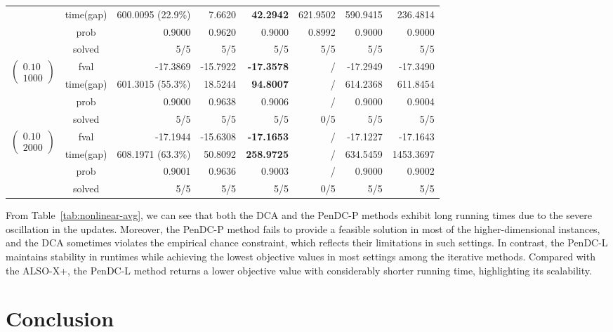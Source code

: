 \documentclass[11pt]{article}
\begin{document}
\begin{table}[ht!]
\begin{tabular}{ccrrrrrr}
& time(gap)  & 600.0095 (22.9\%) & 7.6620 & \textbf{42.2942} & 621.9502 & 590.9415 & 236.4814\\
& prob  & 0.9000 & 0.9620 & 0.9000 & 0.8992 & 0.9000 & 0.9000\\
& solved & 5/5 & 5/5 & 5/5 & 5/5 & 5/5 & 5/5\\
\midrule
\multirow{4}{*}{$\left(\begin{array}{c} 0.10 \\ 1000 \end{array}\right)$} & fval  & -17.3869 & -15.7922 & \textbf{-17.3578} & / & -17.2949 & -17.3490\\
& time(gap)  & 601.3015 (55.3\%) & 18.5244 & \textbf{94.8007} & / & 614.2368 & 611.8454\\
& prob  & 0.9000 & 0.9638 & 0.9006 & / & 0.9000 & 0.9004\\
& solved & 5/5 & 5/5 & 5/5 & 0/5 & 5/5 & 5/5\\
\midrule
\multirow{4}{*}{$\left(\begin{array}{c} 0.10 \\ 2000 \end{array}\right)$} & fval  & -17.1944 & -15.6308 & \textbf{-17.1653} & / & -17.1227 & -17.1643\\
& time(gap)  & 608.1971 (63.3\%) & 50.8092 & \textbf{258.9725} & / & 634.5459 & 1453.3697\\
& prob  & 0.9001 & 0.9636 & 0.9003 & / & 0.9000 & 0.9002\\
& solved & 5/5 & 5/5 & 5/5 & 0/5 & 5/5 & 5/5\\
\bottomrule
\end{tabular}
\vspace{2pt}
\end{table}

From Table~\ref{tab:nonlinear-avg}, we can see that both the DCA and the PenDC-P methods exhibit long running times due to the severe oscillation in the updates. Moreover, the PenDC-P method fails to provide a feasible solution in most of the higher-dimensional instances, and the DCA sometimes violates the empirical chance constraint, which reflects their limitations in such settings. 
In contrast, the PenDC-L maintains stability in runtimes while achieving the lowest objective values in most settings among the iterative methods. Compared with the ALSO-X+, the PenDC-L method returns a lower objective value with considerably shorter running time, highlighting its scalability.


\section{Conclusion}
\label{sec:conclusion}
\end{document}
